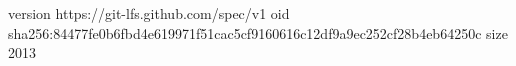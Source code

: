 version https://git-lfs.github.com/spec/v1
oid sha256:84477fe0b6fbd4e619971f51cac5cf9160616c12df9a9ec252cf28b4eb64250c
size 2013
